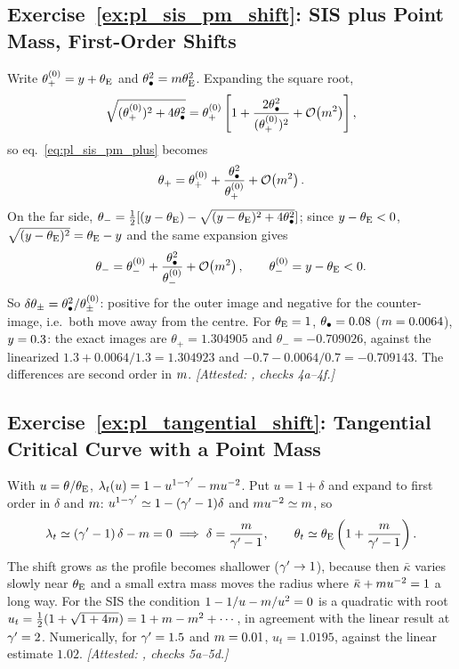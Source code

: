 \subsection*{Exercise~\ref{ex:pl_sis_pm_shift}: SIS plus Point Mass, First-Order Shifts}

Write $\theta_+^{(0)}=y+\theta_{\mathrm{E}}$ and $\theta_{\bullet}^2=m\theta_{\mathrm{E}}^2$.  Expanding the square root,
\begin{equation*}
    \sqrt{(\theta_+^{(0)})^2+4\theta_{\bullet}^2}
    =\theta_+^{(0)}\left[1+\frac{2\theta_{\bullet}^2}{(\theta_+^{(0)})^2}+\mathcal{O}\!\left(m^2\right)\right] ,
\end{equation*}
so eq.~\eqref{eq:pl_sis_pm_plus} becomes
\begin{equation*}
    \theta_+=\theta_+^{(0)}+\frac{\theta_{\bullet}^2}{\theta_+^{(0)}}+\mathcal{O}\!\left(m^2\right) .
\end{equation*}
On the far side, $\theta_-=\tfrac12[(y-\theta_{\mathrm{E}})-\sqrt{(y-\theta_{\mathrm{E}})^2+4\theta_{\bullet}^2}]$;
since $y-\theta_{\mathrm{E}}<0$, $\sqrt{(y-\theta_{\mathrm{E}})^2}=\theta_{\mathrm{E}}-y$ and the
same expansion gives
\begin{equation*}
    \theta_-=\theta_-^{(0)}+\frac{\theta_{\bullet}^2}{\theta_-^{(0)}}+\mathcal{O}\!\left(m^2\right) ,
    \qquad \theta_-^{(0)}=y-\theta_{\mathrm{E}}<0 .
\end{equation*}
So $\delta\theta_\pm=\theta_{\bullet}^2/\theta_\pm^{(0)}$: positive for the
outer image and negative for the counter-image, i.e.\ both move away
from the centre.  For $\theta_{\mathrm{E}}=1$, $\theta_{\bullet}=0.08$ ($m=0.0064$),
$y=0.3$: the exact images are $\theta_+=1.304905$ and
$\theta_-=-0.709026$, against the linearized $1.3+0.0064/1.3=1.304923$
and $-0.7-0.0064/0.7=-0.709143$.  The differences are second order in
$m$.
\emph{[Attested: , checks 4a--4f.]}

\subsection*{Exercise~\ref{ex:pl_tangential_shift}: Tangential Critical Curve with a Point Mass}

With $u=\theta/\theta_{\mathrm{E}}$, $\lambda_t(u)=1-u^{1-\gamma'}-m u^{-2}$.  Put
$u=1+\delta$ and expand to first order in $\delta$ and $m$:
$u^{1-\gamma'}\simeq1-(\gamma'-1)\delta$ and $m u^{-2}\simeq m$, so
\begin{equation*}
    \lambda_t\simeq(\gamma'-1)\,\delta-m=0
    \;\Longrightarrow\;
    \delta=\frac{m}{\gamma'-1} ,
    \qquad
    \theta_t\simeq\theta_{\mathrm{E}}\left(1+\frac{m}{\gamma'-1}\right) .
\end{equation*}
The shift grows as the profile becomes shallower ($\gamma'\to1$), because
then $\bar\kappa$ varies slowly near $\theta_{\mathrm{E}}$ and a small extra mass
moves the radius where $\bar\kappa+m u^{-2}=1$ a long way.  For the
SIS the condition $1-1/u-m/u^2=0$ is a quadratic with root
$u_t=\tfrac12(1+\sqrt{1+4m})=1+m-m^2+\cdots$, in agreement
with the linear result at $\gamma'=2$.  Numerically, for $\gamma'=1.5$ and
$m=0.01$, $u_t=1.0195$, against the linear estimate $1.02$.
\emph{[Attested: , checks 5a--5d.]}


